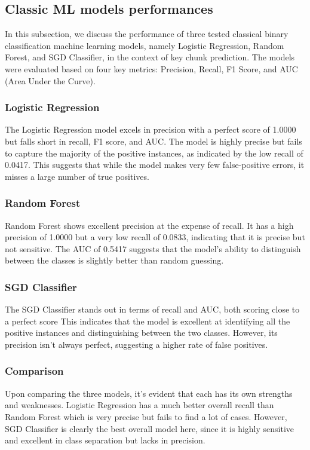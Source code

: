 \subsection{Classic ML models performances}

In this subsection, we discuss the performance of three tested classical binary classification machine learning models, namely Logistic Regression, Random Forest, and SGD Classifier, in the context of key chunk prediction. The models were evaluated based on four key metrics: Precision, Recall, F1 Score, and AUC (Area Under the Curve).

\subsubsection{Logistic Regression}
The Logistic Regression model excels in precision with a perfect score of 1.0000 but falls short in recall, F1 score, and AUC. The model is highly precise but fails to capture the majority of the positive instances, as indicated by the low recall of 0.0417. This suggests that while the model makes very few false-positive errors, it misses a large number of true positives.

\subsubsection{Random Forest}
Random Forest shows excellent precision at the expense of recall. It has a high precision of 1.0000 but a very low recall of 0.0833, indicating that it is precise but not sensitive. The AUC of 0.5417 suggests that the model's ability to distinguish between the classes is slightly better than random guessing.

\subsubsection{SGD Classifier}
The SGD Classifier stands out in terms of recall and AUC, both scoring close to a perfect score This indicates that the model is excellent at identifying all the positive instances and distinguishing between the two classes. However, its precision isn't always perfect, suggesting a higher rate of false positives.

\subsubsection{Comparison}
Upon comparing the three models, it's evident that each has its own strengths and weaknesses. Logistic Regression has a much better overall recall than Random Forest which is very precise but fails to find a lot of cases. However, SGD Classifier is clearly the best overall model here, since it is highly sensitive and excellent in class separation but lacks in precision.

